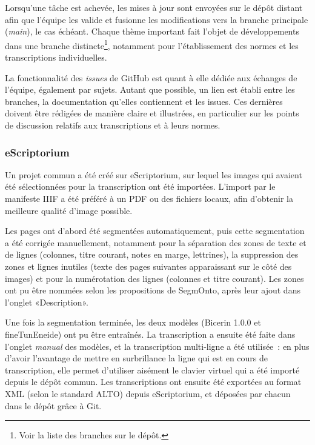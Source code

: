 \documentclass{article}
\begin{document}
	\vspace{3pt}
	
	Lorsqu'une tâche est achevée, les mises à jour sont envoyées sur le dépôt distant afin que l'équipe les valide et fusionne les modifications vers la branche principale (\textit{main}), le cas échéant. Chaque thème important fait l'objet de développements dans une branche distincte\footnote{Voir la liste des branches sur le dépôt.}, notamment pour l'établissement des normes et les transcriptions individuelles.
	\newline
	
	
	La fonctionnalité des \textit{issues} de GitHub est quant à elle dédiée aux échanges de l'équipe, également par sujets. Autant que possible, un lien est établi entre les branches, la documentation qu'elles contiennent et les issues.
	Ces dernières doivent être rédigées de manière claire et illustrées, en particulier sur les points de discussion relatifs aux transcriptions et à leurs normes.
	
	\subsubsection{eScriptorium}
	
	Un projet commun a été créé sur eScriptorium, sur lequel les images qui avaient été sélectionnées pour la transcription ont été importées. L’import par le manifeste IIIF a été préféré à un PDF ou des fichiers locaux, afin d’obtenir la meilleure qualité d’image possible.
	
	Les pages ont d’abord été segmentées automatiquement, puis cette segmentation a été corrigée manuellement, notamment pour la séparation des zones de texte et de lignes (colonnes, titre courant, notes en marge, lettrines), la suppression des zones et lignes inutiles (texte des pages suivantes apparaissant sur le côté des images) et pour la numérotation des lignes (colonnes et titre courant). Les zones ont pu être nommées selon les propositions de SegmOnto, après leur ajout dans l’onglet «Description».
	
	Une fois la segmentation terminée, les deux modèles (Bicerin 1.0.0 et fineTunEneide) ont pu être entraînés. La transcription a ensuite été faite dans l’onglet \textit{manual} des modèles, et la transcription multi-ligne a été utilisée~: en plus d’avoir l’avantage de mettre en surbrillance la ligne qui est en cours de transcription, elle permet d’utiliser aisément le clavier virtuel qui a été importé depuis le dépôt commun. Les transcriptions ont ensuite été exportées au format XML (selon le standard ALTO) depuis eScriptorium, et déposées par chacun dans le dépôt grâce à Git.
	
\end{document}
